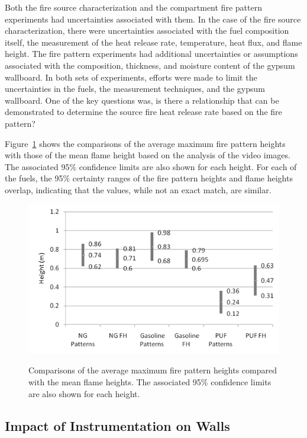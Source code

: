 \documentclass[twoside]{uocthesis}
\begin{document}
{Both the fire source characterization and the compartment fire pattern experiments had uncertainties associated with them.  In the case of the fire source characterization, there were uncertainties associated with the fuel composition itself, the measurement of the heat release rate, temperature, heat flux, and flame height.  The fire pattern experiments had additional uncertainties or assumptions associated with the composition, thickness, and moisture content of the gypsum wallboard. In both sets of experiments, efforts were made to limit the uncertainties in the fuels, the measurement techniques, and the gypsum wallboard.  One of the key questions was, is there a relationship that can be demonstrated to determine the source fire heat release rate based on the fire pattern?

Figure~\ref{FH_FP_comp} shows the comparisons of the average maximum fire pattern heights with those of the mean flame height based on the analysis of the video images.  The associated 95\% confidence limits are also shown for each height.  For each of the fuels, the 95\% certainty ranges of the fire pattern heights and flame heights overlap, indicating that the values, while not an exact match, are similar.     

\begin{figure}[h]
  \centering
  \includegraphics[width=5.0in]{../Figures/FH_FP_Comp1}  \\
  \caption[Comparisons of the average maximum fire pattern heights compared with the mean flame heights.]{Comparisons of the average maximum fire pattern heights compared with the mean flame heights. The associated 95\% confidence limits are also shown for each height.}
  \label{FH_FP_comp}
\end{figure}

\subsection{Impact of Instrumentation on Walls}

}
\end{document}

